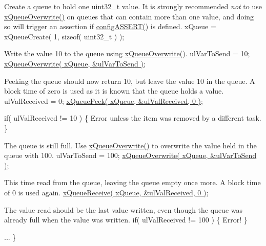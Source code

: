 \begin{DoxyPre}Create a queue to hold one uint32\_t value.  It is strongly
recommended {\itshape not} to use \hyperlink{queue_8h_a8e9ced123b5a0e37a36d3bbdb2e56b4e}{xQueueOverwrite()} on queues that can
contain more than one value, and doing so will trigger an assertion
if \hyperlink{FreeRTOSConfig_8h_a228c70cd48927d6ab730ed1a6dfbe35f}{configASSERT()} is defined.
    xQueue = xQueueCreate( 1, sizeof( uint32\_t ) );\end{DoxyPre}



\begin{DoxyPre}Write the value 10 to the queue using \hyperlink{queue_8h_a8e9ced123b5a0e37a36d3bbdb2e56b4e}{xQueueOverwrite()}.
    ulVarToSend = 10;
    \hyperlink{queue_8h_a8e9ced123b5a0e37a36d3bbdb2e56b4e}{xQueueOverwrite( xQueue, &ulVarToSend )};\end{DoxyPre}



\begin{DoxyPre}Peeking the queue should now return 10, but leave the value 10 in
the queue.  A block time of zero is used as it is known that the
queue holds a value.
    ulValReceived = 0;
    \hyperlink{queue_8h_a2df70733bb875477cd9614c5b3446257}{xQueuePeek( xQueue, &ulValReceived, 0 )};\end{DoxyPre}



\begin{DoxyPre}    if( ulValReceived != 10 )
    \{
Error unless the item was removed by a different task.
    \}\end{DoxyPre}



\begin{DoxyPre}The queue is still full.  Use \hyperlink{queue_8h_a8e9ced123b5a0e37a36d3bbdb2e56b4e}{xQueueOverwrite()} to overwrite the
value held in the queue with 100.
    ulVarToSend = 100;
    \hyperlink{queue_8h_a8e9ced123b5a0e37a36d3bbdb2e56b4e}{xQueueOverwrite( xQueue, &ulVarToSend )};\end{DoxyPre}



\begin{DoxyPre}This time read from the queue, leaving the queue empty once more.
A block time of 0 is used again.
    \hyperlink{queue_8h_af1549eac0e7f05694a59a0b967c80be3}{xQueueReceive( xQueue, &ulValReceived, 0 )};\end{DoxyPre}



\begin{DoxyPre}The value read should be the last value written, even though the
queue was already full when the value was written.
    if( ulValReceived != 100 )
    \{
Error!
    \}\end{DoxyPre}



\begin{DoxyPre}...
\}
 \end{DoxyPre}
 